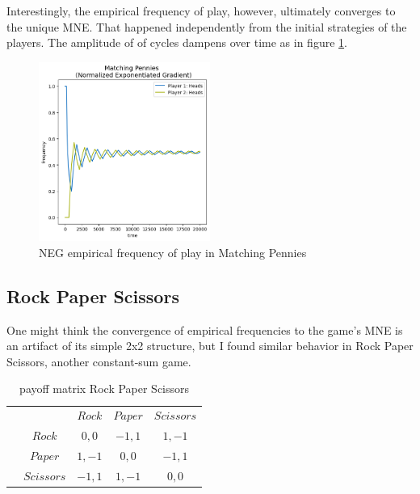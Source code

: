 Interestingly, the empirical frequency of play, however, ultimately converges to the unique MNE. That happened independently from the initial strategies of the players. The amplitude of of cycles dampens over time as in figure \ref{fig:Pennies3}.

\begin{figure}[H]
    \centering
    \includegraphics[width=0.5\textwidth]{logos/Pennies3.png}
    \caption{NEG empirical frequency of play in Matching Pennies}
    \label{fig:Pennies3}
\end{figure}


\subsection{Rock Paper Scissors}\label{subsection:rockPaperScissors}

One might think the convergence of empirical frequencies to the game's MNE is an artifact of its simple 2x2 structure, but I found similar behavior in Rock Paper Scissors, another constant-sum game.

\begin{table}[H]\centering
\setlength{\extrarowheight}{2pt}
\begin{tabular}{cc|c|c|c|}
  & \multicolumn{1}{c}{} & \multicolumn{1}{c}{$Rock$}  & \multicolumn{1}{c}{$Paper$}  & \multicolumn{1}{c}{$Scissors$} \\\cline{3-5}
            & $Rock$ & $0,0$ & $-1,1$ & $1,-1$ \\ \cline{3-5}
            & $Paper$ & $1,-1$ & $0,0$ & $-1,1$ \\\cline{3-5}
            & $Scissors$ & $-1,1$ & $1,-1$ & $0,0$ \\\cline{3-5}
\end{tabular}\caption{\label{tab:payoffRPS}payoff matrix Rock Paper Scissors}
\end{table}

